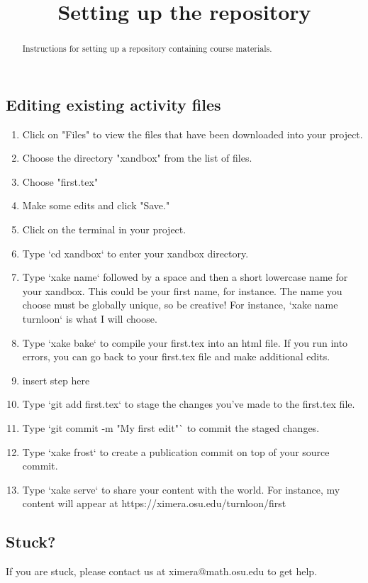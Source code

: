 \documentclass{ximera}
\title{Setting up the repository}
\begin{document}
\begin{abstract}
Instructions for setting up a repository containing course materials.
\end{abstract}
\maketitle


\subsection{Editing existing activity files}
\begin{enumerate}

\item Click on "Files" to view the files that have been downloaded into your project.
\item Choose the directory "xandbox" from the list of files.
\item Choose "first.tex"
\item Make some edits and click "Save."
\item Click on the terminal in your project.
\item Type `cd xandbox` to enter your xandbox directory.
\item Type `xake name` followed by a space and then a short lowercase name for your xandbox.  This could be your first name, for instance.  The name you choose must be globally unique, so be creative!  For instance, `xake name turnloon` is what I will choose.
\item Type `xake bake` to compile your first.tex into an html file.  If you run into errors, you can go back to your first.tex file and make additional edits.
\item insert step here
\item Type `git add first.tex` to stage the changes you've made to the first.tex file.
\item Type `git commit -m "My first edit"` to commit the staged changes.
\item Type `xake frost` to create a publication commit on top of your source commit.
\item Type `xake serve` to share your content with the world.  For instance, my content will appear at https://ximera.osu.edu/turnloon/first
\end{enumerate}
\subsection{Stuck?}

If you are stuck, please contact us at ximera@math.osu.edu to get help.
\end{document}
